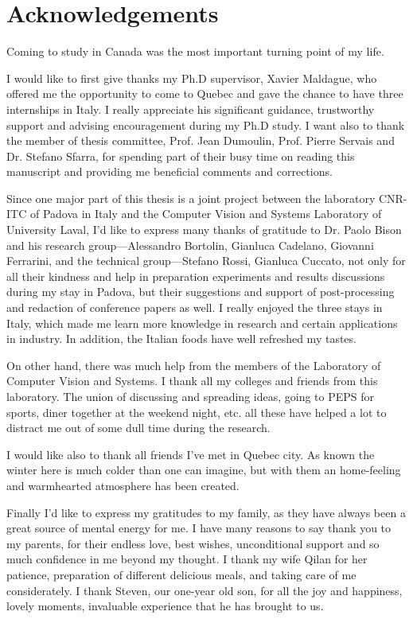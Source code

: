 \chapter*{Acknowledgements}         %

Coming to study in Canada was the most important turning point of my life.

I would like to first give thanks my Ph.D supervisor, Xavier Maldague, who offered me the opportunity to come to Quebec and gave the chance to have three internships in Italy. I really appreciate his significant guidance, trustworthy support and advising encouragement during my Ph.D study. I want also to thank the member of thesis committee, Prof. Jean Dumoulin,  Prof. Pierre Servais and Dr. Stefano Sfarra, for spending part of their busy time on reading this manuscript and providing me beneficial comments and corrections.


Since one major part of this thesis is a joint project between the laboratory CNR-ITC of Padova in Italy and the Computer Vision and Systems Laboratory of University Laval, I’d like to express many thanks of gratitude to Dr. Paolo Bison and his research group—Alessandro Bortolin, Gianluca Cadelano, Giovanni Ferrarini, and the technical group—Stefano Rossi, Gianluca Cuccato, not only for all their kindness and help in preparation experiments and results discussions during my stay in Padova, but their suggestions and support of post-processing and redaction of conference papers as well. I really enjoyed the three stays in Italy, which made me learn more knowledge in research and certain applications in industry. In addition, the Italian foods have well refreshed my tastes.

On other hand, there was much help from the members of the Laboratory of Computer Vision and Systems. I thank all my colleges and friends from this laboratory. The union of discussing and spreading ideas, going to PEPS for sports, diner together at the weekend night, etc. all these have helped a lot to distract me out of some dull time during the research.

I would like also to thank all friends I've met in Quebec city. As known the winter here is much colder than one can imagine, but with them an home-feeling and warmhearted atmosphere has been created. 

Finally I'd like to express my gratitudes to my family, as they have always been a great source of mental energy for me. I have many reasons to say thank you to my parents, for their endless love, best wishes, unconditional support and so much confidence in me beyond my thought. I thank my wife Qilan for her patience, preparation of different delicious meals, and taking care of me considerately. I thank Steven, our one-year old son, for all the joy and happiness, lovely moments, invaluable experience that he has brought to us. 
